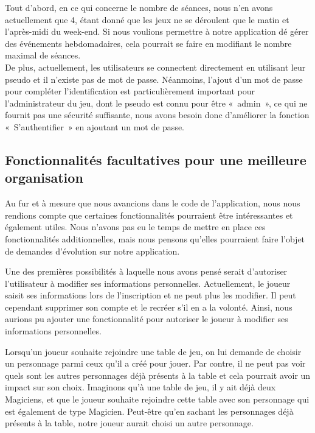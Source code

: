 \documentclass[11pt]{article}
\begin{document}
Tout d'abord, en ce qui concerne le nombre de séances, nous n'en avons actuellement que 4, étant donné que les jeux ne se déroulent que le matin et l'après-midi du week-end. Si nous voulions permettre à notre application dé gérer des événements hebdomadaires, cela pourrait se faire en modifiant le nombre maximal de séances.\\

De plus, actuellement, les utilisateurs se connectent directement en utilisant leur pseudo et il n'existe pas de mot de passe. Néanmoins, l'ajout d'un mot de passe pour compléter l'identification est particulièrement important pour l'administrateur du jeu, dont le pseudo est connu pour être «~admin~», ce qui ne fournit pas une sécurité suffisante, nous avons besoin donc d'améliorer la fonction «~S'authentifier~» en ajoutant un mot de passe.






\subsection{Fonctionnalités facultatives pour une meilleure organisation}

Au fur et à mesure que nous avancions dans le code de l'application, nous nous rendions compte que certaines fonctionnalités pourraient être intéressantes et également utiles. Nous n'avons pas eu le temps de mettre en place ces fonctionnalités additionnelles, mais nous pensons qu'elles pourraient faire l'objet de demandes d'évolution sur notre application.

\bigbreak

Une des premières possibilités à laquelle nous avons pensé serait d'autoriser l'utilisateur à modifier ses informations personnelles. Actuellement, le joueur saisit ses informations lors de l'inscription et ne peut plus les modifier. Il peut cependant supprimer son compte et le recréer s'il en a la volonté. Ainsi, nous aurions pu ajouter une fonctionnalité pour autoriser le joueur à modifier ses informations personnelles.

\bigbreak

Lorsqu'un joueur souhaite rejoindre une table de jeu, on lui demande de choisir un personnage parmi ceux qu'il a créé pour jouer. Par contre, il ne peut pas voir quels sont les autres personnages déjà présents à la table et cela pourrait avoir un impact sur son choix. Imaginons qu'à une table de jeu, il y ait déjà deux Magiciens, et que le joueur souhaite rejoindre cette table avec son personnage qui est également de type Magicien. Peut-être qu'en sachant les personnages déjà présents à la table, notre joueur aurait choisi un autre personnage.
\end{document}
